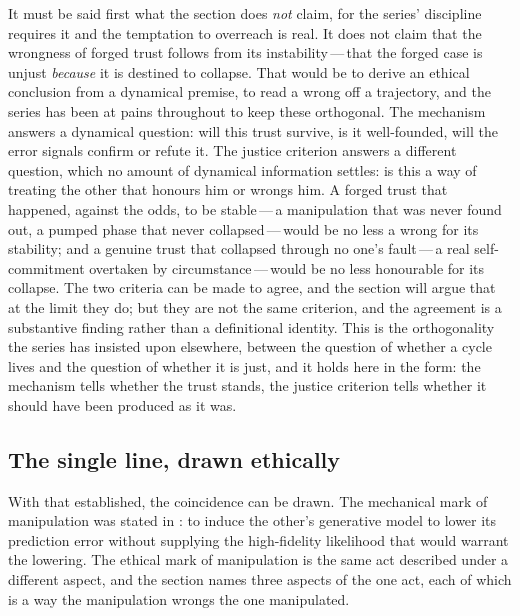 It must be said first what the section does \emph{not} claim, for the series' discipline requires it and the temptation to overreach is real. It does not claim that the wrongness of forged trust follows from its instability\,---\,that the forged case is unjust \emph{because} it is destined to collapse. That would be to derive an ethical conclusion from a dynamical premise, to read a wrong off a trajectory, and the series has been at pains throughout to keep these orthogonal. The mechanism answers a dynamical question: will this trust survive, is it well-founded, will the error signals confirm or refute it. The justice criterion answers a different question, which no amount of dynamical information settles: is this a way of treating the other that honours him or wrongs him. A forged trust that happened, against the odds, to be stable\,---\,a manipulation that was never found out, a pumped phase that never collapsed\,---\,would be no less a wrong for its stability; and a genuine trust that collapsed through no one's fault\,---\,a real self-commitment overtaken by circumstance\,---\,would be no less honourable for its collapse. The two criteria can be made to agree, and the section will argue that at the limit they do; but they are not the same criterion, and the agreement is a substantive finding rather than a definitional identity. This is the orthogonality the series has insisted upon elsewhere, between the question of whether a cycle lives and the question of whether it is just, and it holds here in the form: the mechanism tells whether the trust stands, the justice criterion tells whether it should have been produced as it was.

\subsection{The single line, drawn ethically}
\label{p13:sub:just-line}

With that established, the coincidence can be drawn. The mechanical mark of manipulation was stated in : to induce the other's generative model to lower its prediction error without supplying the high-fidelity likelihood that would warrant the lowering. The ethical mark of manipulation is the same act described under a different aspect, and the section names three aspects of the one act, each of which is a way the manipulation wrongs the one manipulated.

